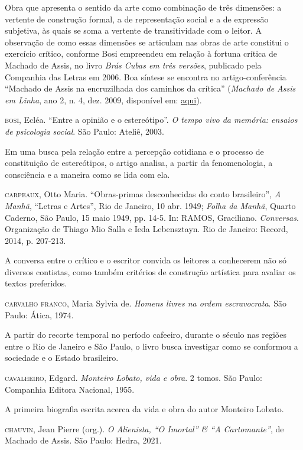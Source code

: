 \documentclass[11pt]{extarticle}
\begin{document}
Obra que apresenta o sentido da arte como combinação de três
dimensões: a vertente de construção formal, a de representação social e
a de expressão subjetiva, às quais se soma a vertente de transitividade
com o leitor. A observação de como essas dimensões se articulam nas
obras de arte constitui o exercício crítico, conforme Bosi empreendeu em
relação à fortuna crítica de Machado de Assis, no livro \emph{Brás Cubas
em três versões}, publicado pela Companhia das Letras em 2006. Boa
síntese se encontra no artigo-conferência ``Machado de Assis na
encruzilhada dos caminhos da crítica'' (\emph{Machado de Assis em
Linha}, ano 2, n. 4, dez. 2009, disponível em:
\href{http://machadodeassis.net/download/numero04/num04artigo02.pdf}{aqui}).

\textsc{bosi}, Ecléa. ``Entre a opinião e o estereótipo''. \emph{O tempo vivo da
memória: ensaios de psicologia social}. São Paulo: Ateliê, 2003.

Em uma busca pela relação entre a percepção cotidiana e o processo de constituição de 
estereótipos, o artigo analisa, a partir da fenomenologia, a consciência e a maneira 
como se lida com ela.

\textsc{carpeaux}, Otto Maria. ``Obras-primas desconhecidas do conto
brasileiro'', \emph{A Manhã}, ``Letras e Artes'', Rio de Janeiro, 10
abr. 1949; \emph{Folha da Manhã}, Quarto Caderno, São Paulo, 15 maio
1949, pp. 14-5. In: RAMOS, Graciliano. \emph{Conversas}. Organização de
Thiago Mio Salla e Ieda Lebensztayn. Rio de Janeiro: Record, 2014, p.
207-213. 

A conversa entre o crítico e o escritor convida os leitores a
conhecerem não só diversos contistas, como também critérios de
construção artística para avaliar os textos preferidos.

\textsc{carvalho franco}, Maria Sylvia de. \emph{Homens livres na ordem
escravocrata}. São Paulo: Ática, 1974.

A partir do recorte temporal no período cafeeiro, durante o século  
nas regiões entre o Rio de Janeiro e São Paulo, o livro busca investigar como 
se conformou a sociedade e o Estado brasileiro. 

\textsc{cavalheiro}, Edgard. \emph{Monteiro Lobato, vida e obra}. 2 tomos. São
Paulo: Companhia Editora Nacional, 1955.

A primeira biografia escrita acerca da vida e obra do autor Monteiro Lobato.

\textsc{chauvin}, Jean Pierre (org.). \emph{O Alienista, ``O Imortal'' \& ``A
Cartomante''}, de Machado de Assis. São Paulo: Hedra, 2021.
\end{document}
